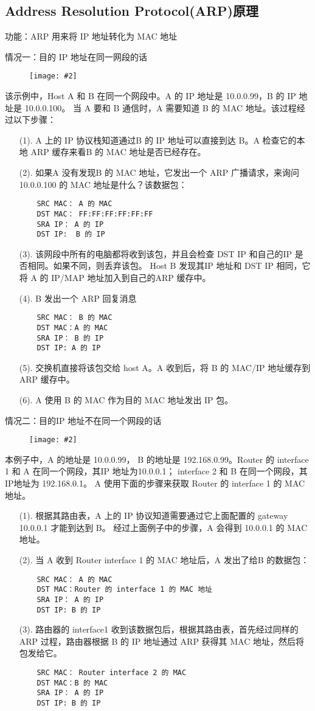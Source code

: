 \documentclass[a4paper,left=1.5cm,right=1.5cm,11pt]{article}
\newcommand{\sizedfic}[2]{\begin{figure}[H]
		\center
		\texttt{[image: \#2]}
	\end{figure}}
\begin{document}
\subsection{Address Resolution Protocol(ARP)原理}
功能：ARP 用来将 IP 地址转化为 MAC 地址\par
情况一：目的 IP 地址在同一网段的话
\sizedfic{0.5}{arp_1.png}
该示例中，Host A 和 B 在同一个网段中。A 的 IP 地址是 10.0.0.99，B 的 IP 地址是 10.0.0.100。
当 A 要和 B 通信时，A 需要知道 B 的 MAC 地址。该过程经过以下步骤：
\begin{itemize}
	\item[(1).]A 上的 IP 协议栈知道通过B 的 IP 地址可以直接到达 B。A 检查它的本地 ARP 缓存来看B 的 MAC 地址是否已经存在。
	\item[(2).]如果A 没有发现B 的 MAC 地址，它发出一个 ARP 广播请求，来询问10.0.0.100 的 MAC 地址是什么？该数据包：
	\begin{lstlisting}
	SRC MAC： A 的 MAC
	DST MAC： FF:FF:FF:FF:FF:FF
	SRA IP： A 的 IP
	DST IP:  B 的 IP
	\end{lstlisting}
	\item[(3).]该网段中所有的电脑都将收到该包，并且会检查 DST IP 和自己的IP 是否相同。如果不同，则丢弃该包。
	Host B 发现其IP 地址和 DST IP 相同，它将 A 的 IP/MAP 地址加入到自己的ARP 缓存中。
	\item[(4).]B 发出一个 ARP 回复消息
	\begin{lstlisting}
	SRC MAC： B 的 MAC
	DST MAC：A 的 MAC
	SRA IP： B 的 IP
	DST IP: A 的 IP
	\end{lstlisting}
	\item[(5).]交换机直接将该包交给 host A。A 收到后，将 B 的 MAC/IP 地址缓存到 ARP 缓存中。
	\item[(6).]A 使用 B 的 MAC 作为目的 MAC 地址发出 IP 包。
\end{itemize}
情况二：目的IP 地址不在同一个网段的话
\sizedfic{0.5}{arp_2.png}
本例子中，A 的地址是 10.0.0.99， B 的地址是 192.168.0.99。Router 的 interface 1 和 A 在同一个网段，其IP 地址为10.0.0.1；
interface 2 和 B 在同一个网段，其IP地址为 192.168.0.1。 A 使用下面的步骤来获取 Router 的 interface 1 的 MAC 地址。
\begin{itemize}
	\item[(1).]根据其路由表，A 上的 IP 协议知道需要通过它上面配置的 gateway 10.0.0.1 才能到达到 B。
	经过上面例子中的步骤，A 会得到 10.0.0.1 的 MAC 地址。
	\item[(2).]当 A 收到 Router interface 1 的 MAC 地址后，A 发出了给B 的数据包：
	\begin{lstlisting}
	SRC MAC： A 的 MAC
	DST MAC：Router 的 interface 1 的 MAC 地址
	SRA IP： A 的 IP
	DST IP: B 的 IP
	\end{lstlisting}
	\item[(3).]路由器的 interface1 收到该数据包后，根据其路由表，首先经过同样的ARP 过程，路由器根据 B 的 IP 地址通过 ARP 获得其 MAC 地址，然后将包发给它。
	\begin{lstlisting}
	SRC MAC： Router interface 2 的 MAC
	DST MAC：B 的 MAC
	SRA IP： A 的 IP
	DST IP: B 的 IP
	\end{lstlisting}
\end{itemize}
\section{}
\end{document}
